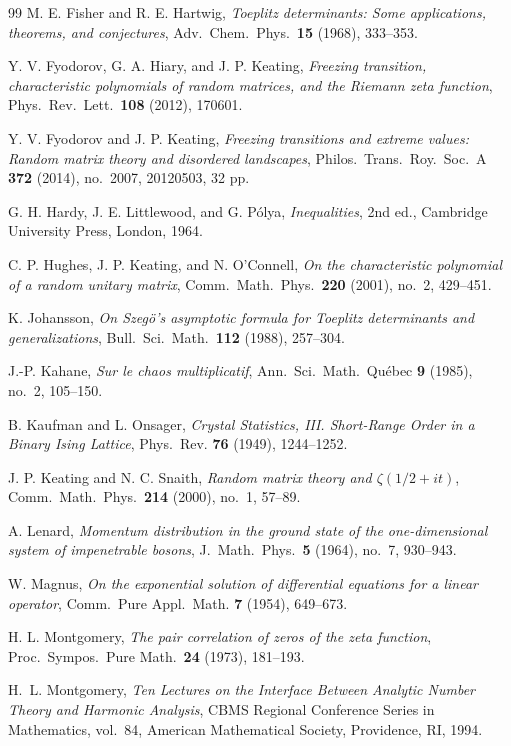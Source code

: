 \documentclass[11pt]{amsart}
\theoremstyle{plain}
\theoremstyle{remark}
\numberwithin{equation}{section}
\begin{document}
\begin{thebibliography}{99}
M. E. Fisher and R. E. Hartwig,
\emph{Toeplitz determinants: Some applications, theorems, and conjectures},
Adv.\ Chem.\ Phys.\ \textbf{15} (1968), 333--353.

Y. V. Fyodorov, G. A. Hiary, and J. P. Keating,
\emph{Freezing transition, characteristic polynomials of random matrices, and the Riemann zeta function},
Phys.\ Rev.\ Lett.\ \textbf{108} (2012), 170601.

Y. V. Fyodorov and J. P. Keating,
\emph{Freezing transitions and extreme values: Random matrix theory and disordered landscapes},
Philos.\ Trans.\ Roy.\ Soc.\ A \textbf{372} (2014), no.~2007, 20120503, 32 pp.


 G. H. Hardy, J. E. Littlewood, and G. P\'{o}lya, \emph{Inequalities}, 2nd ed., Cambridge University Press, London, 1964.


C. P. Hughes, J. P. Keating, and N. O'Connell,
\emph{On the characteristic polynomial of a random unitary matrix},
Comm.\ Math.\ Phys.\ \textbf{220} (2001), no.~2, 429--451.

K. Johansson,
\emph{On Szeg\"o's asymptotic formula for Toeplitz determinants and generalizations},
Bull.\ Sci.\ Math.\ \textbf{112} (1988), 257--304.

J.-P. Kahane,
\emph{Sur le chaos multiplicatif},
Ann.\ Sci.\ Math.\ Qu\'ebec \textbf{9} (1985), no.~2, 105--150.

 B. Kaufman and L. Onsager, \emph{Crystal Statistics, III. Short-Range Order in a Binary Ising Lattice}, Phys.\ Rev. \textbf{76} (1949), 1244--1252.


J. P. Keating and N. C. Snaith,
\emph{Random matrix theory and $\zeta(1/2+it)$},
Comm.\ Math.\ Phys.\ \textbf{214} (2000), no.~1, 57--89.

A. Lenard,
\emph{Momentum distribution in the ground state of the one-dimensional system of impenetrable bosons},
J.\ Math.\ Phys.\ \textbf{5} (1964), no.~7, 930--943.

 W. Magnus, \emph{On the exponential solution of differential equations for a linear operator}, Comm.\ Pure Appl.\ Math. \textbf{7} (1954), 649--673.

H. L. Montgomery,
\emph{The pair correlation of zeros of the zeta function},
Proc.\ Sympos.\ Pure Math.\ \textbf{24} (1973), 181--193.

 H.~L. Montgomery, \emph{Ten Lectures on the Interface Between Analytic Number Theory and Harmonic Analysis}, CBMS Regional Conference Series in Mathematics, vol.~84, American Mathematical Society, Providence, RI, 1994.


\end{thebibliography}
\end{document}
